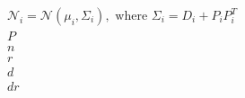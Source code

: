 \documentclass[preview]{standalone}
\begin{document}
\begin{align*} %
\mathcal{N}_i = \mathcal{N}(\mu_i,\Sigma_i), \text{ where } \Sigma_i= D_i +
  P_i P_i^T\\
  P\\
  n\\
  r\\
  d\\
  dr\\
\end{align*}
\end{document}
